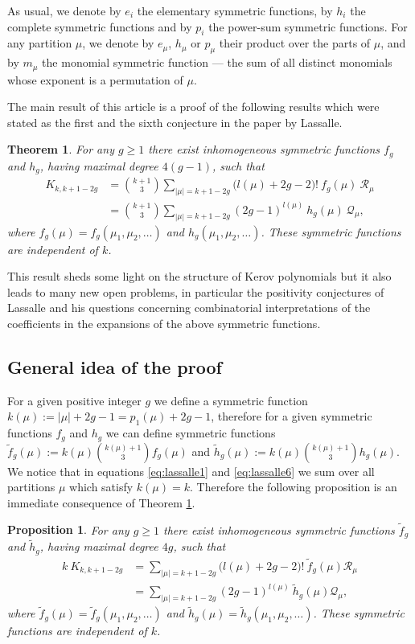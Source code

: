 \documentclass[12pt]{amsart}
\theoremstyle{plain}
\newtheorem{theorem}[lemma]{Theorem}
\newtheorem{proposition}[lemma]{Proposition}
\theoremstyle{remark}
\begin{document}
As usual, we denote by $e_i$ the elementary symmetric functions, by $h_i$ the
complete symmetric functions and by $p_i$ the power-sum symmetric functions. For
any partition $\mu$, we denote by $e_{\mu}$, $h_{\mu}$ or $p_{\mu}$ their
product over the parts of $\mu$, and by $m_{\mu}$ the monomial symmetric
function --- the sum of all distinct monomials whose exponent is
a permutation of $\mu$.

The main result of this article is a proof of the following results
which were stated as the first and the sixth conjecture in the
paper \cite{Lassalle-preprint2007} by Lassalle.
\begin{theorem}
\label{theo:main}
For any $g\geq 1$ there exist inhomogeneous symmetric
functions $f_g$ and $h_g$, having maximal degree $4(g-1)$, such that
\begin{align}
\label{eq:lassalle1}
K_{k,k+1-2g} &= \binom{k+1}{3}  \sum_{|\mu|=k+1-2g}
\big(l(\mu) + 2g - 2\big)!\ f_g(\mu)\ \mathcal{R}_\mu \\
\label{eq:lassalle6}
 &= \binom{k+1}{3}  \sum_{|\mu|=k+1-2g}
(2g - 1)^{l(\mu)}\ h_g(\mu)\ \mathcal{Q}_\mu,
\end{align}
where $f_g(\mu) = f_g(\mu_1,\mu_2,\dots)$ and $h_g(\mu_1,\mu_2,\dots)$. These
symmetric functions are independent of $k$.
\end{theorem}

This result sheds some light on the structure of Kerov polynomials but it
also leads to many new open problems, in particular the positivity
conjectures of
Lassalle \cite{Lassalle-preprint2007} and his questions concerning combinatorial
interpretations of the coefficients in the expansions of the above symmetric
functions.


\subsection{General idea of the proof}
For a given positive integer $g$ we define a symmetric function
$k(\mu) := |\mu|+2g-1 = p_1(\mu) + 2g - 1$,
therefore for a given symmetric functions $f_g$ and $h_g$ we can define
symmetric functions $ \tilde{f}_g(\mu) := k(\mu) \binom{k(\mu)+1}{3} f_g(\mu)$
and $
\tilde{h}_g(\mu) := k(\mu) \binom{k(\mu)+1}{3} h_g(\mu)$. We notice that in
equations \eqref{eq:lassalle1} and \eqref{eq:lassalle6} we sum over
all partitions $\mu$ which satisfy $k(\mu) = k$.
Therefore the following proposition
is an immediate consequence of Theorem \ref{theo:main}.

\begin{proposition}
\label{prop:main-prop}
For any $g\geq 1$ there exist inhomogeneous symmetric
functions $\tilde{f}_g$ and $\tilde{h}_g$, having maximal degree $4g$, such
that
\begin{align*}
k\ K_{k,k+1-2g} &=  \sum_{|\mu|=k+1-2g}
\big(l(\mu) + 2g - 2\big)! \ \tilde{f}_g(\mu) \mathcal{R}_\mu \\ 
 &= \sum_{|\mu|=k+1-2g}
(2g - 1)^{l(\mu)}\ \tilde{h}_g(\mu) \mathcal{Q}_\mu,
\end{align*}
where $\tilde{f}_g(\mu) = \tilde{f}_g(\mu_1,\mu_2,\dots)$ and $\tilde{h}_g(\mu)
= \tilde{h}_g(\mu_1,\mu_2,\dots)$. These symmetric functions are independent of
$k$.
\end{proposition}
\end{document}

